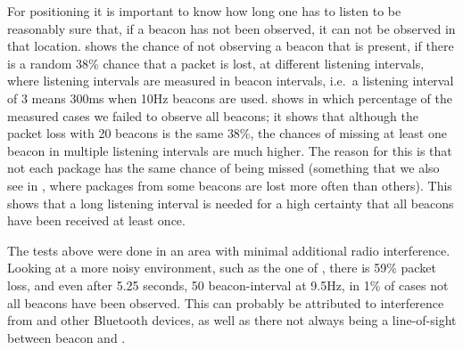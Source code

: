 For positioning it is important to know how long one has to listen to be reasonably sure that, if a beacon has not been observed, it can not be observed in that location.
 shows the chance of not observing a beacon that is present, if there is a random 38\% chance that a packet is lost, at different listening intervals, where listening intervals are measured in beacon intervals, i.e.\ a listening interval of 3 means 300ms when 10Hz beacons are used.
 shows in which percentage of the measured cases we failed to observe all beacons; it shows that although the packet loss with 20 beacons is the same 38\%, the chances of missing at least one beacon in multiple listening intervals are much higher.
The reason for this is that not each package has the same chance of being missed (something that we also see in , where packages from some beacons are lost more often than others).
This shows that a long listening interval is needed for a high certainty that all beacons have been received at least once.

The tests above were done in an area with minimal additional radio interference.
Looking at a more noisy environment, such as the one of , there is 59\% packet loss, and even after 5.25 seconds, 50 beacon-interval at 9.5Hz, in 1\% of cases not all beacons have been observed.
This can probably be attributed to interference from \wifi and other Bluetooth devices, as well as there not always being a line-of-sight between beacon and \device.

